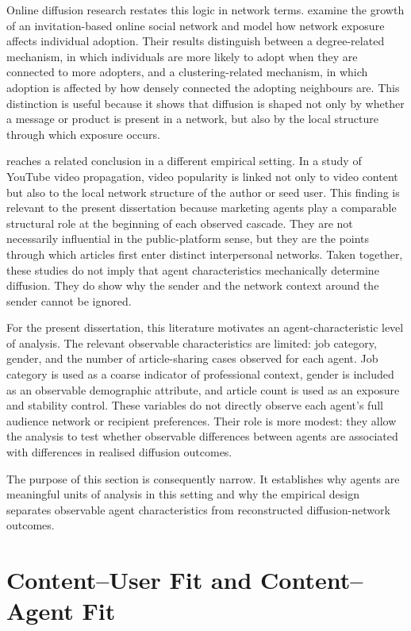 Online diffusion research restates this logic in network terms. \textcite{katona2011} examine the growth of an invitation-based online social network and model how network exposure affects individual adoption. Their results distinguish between a degree-related mechanism, in which individuals are more likely to adopt when they are connected to more adopters, and a clustering-related mechanism, in which adoption is affected by how densely connected the adopting neighbours are. This distinction is useful because it shows that diffusion is shaped not only by whether a message or product is present in a network, but also by the local structure through which exposure occurs.

\textcite{yoganarasimhan2012} reaches a related conclusion in a different empirical setting. In a study of YouTube video propagation, video popularity is linked not only to video content but also to the local network structure of the author or seed user. This finding is relevant to the present dissertation because marketing agents play a comparable structural role at the beginning of each observed cascade. They are not necessarily influential in the public-platform sense, but they are the points through which articles first enter distinct interpersonal networks. Taken together, these studies do not imply that agent characteristics mechanically determine diffusion. They do show why the sender and the network context around the sender cannot be ignored.

For the present dissertation, this literature motivates an agent-characteristic level of analysis. The relevant observable characteristics are limited: job category, gender, and the number of article-sharing cases observed for each agent. Job category is used as a coarse indicator of professional context, gender is included as an observable demographic attribute, and article count is used as an exposure and stability control. These variables do not directly observe each agent's full audience network or recipient preferences. Their role is more modest: they allow the analysis to test whether observable differences between agents are associated with differences in realised diffusion outcomes.

The purpose of this section is consequently narrow. It establishes why agents are meaningful units of analysis in this setting and why the empirical design separates observable agent characteristics from reconstructed diffusion-network outcomes.

\section{Content–User Fit and Content–Agent Fit}
\label{sec:2-4-content-user-fit-and-content-agent-fit}

